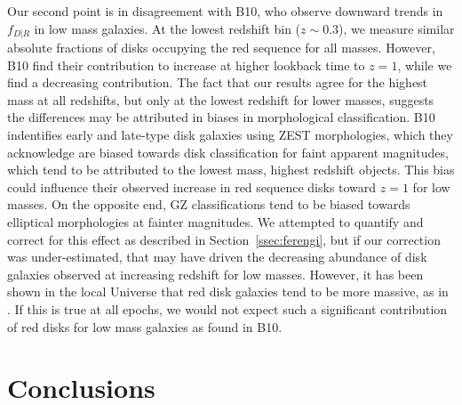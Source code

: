 \documentclass[useAMS,usenatbib]{mn2e}
\begin{document}
Our second point is in disagreement with B10, who observe downward trends in $f_{D|R}$ in low mass galaxies. At the lowest redshift bin ($z\sim0.3$), we measure similar absolute fractions of disks occupying the red sequence for all masses. However, B10 find their contribution to increase at higher lookback time to $z=1$, while we find a decreasing contribution. The fact that our results agree for the highest mass at all redshifts, but only at the lowest redshift for lower masses, suggests the differences may be attributed in biases in morphological classification. B10 indentifies early and late-type disk galaxies using ZEST \citep{Scarlata2007} morphologies, which they acknowledge are biased towards disk classification for faint apparent magnitudes, which tend to be attributed to the lowest mass, highest redshift objects. This bias could influence their observed increase in red sequence disks toward $z=1$ for low masses. On the opposite end, GZ classifications tend to be biased towards elliptical morphologies at fainter magnitudes. We attempted to quantify and correct for this effect as described in Section~\ref{ssec:ferengi}, but if our correction was under-estimated, that may have driven the decreasing abundance of disk galaxies observed at increasing redshift for low masses. However, it has been shown in the local Universe that red disk galaxies tend to be more massive, as in \citet{Masters2011}. If this is true at all epochs, we would not expect such a significant contribution of red disks for low mass galaxies as found in B10. 

%
%
\section{Conclusions}
\label{sec:conclusions}
\end{document}
